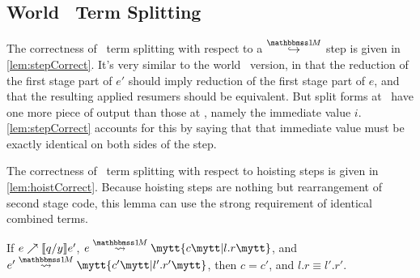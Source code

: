 \begin{abstrsyn}




\subsection{World \bbonem\ Term Splitting}

The correctness of \bbonem\ term splitting with respect to a $\stepsym \bbonem$ step is given in \ref{lem:stepCorrect}.
It's very similar to the world \bbtwo\ version, 
in that the reduction of the first stage part of $e'$ should imply reduction of the first stage part of $e$,
and that the resulting applied resumers should be equivalent.
But split forms at \bbonem\ have one more piece of output than those at \bbtwo,
namely the immediate value $i$.
\ref{lem:stepCorrect} accounts for this by saying that 
that immediate value must be exactly identical on both sides of the step.

The correctness of \bbonem\ term splitting with respect to hoisting steps is given in \ref{lem:hoistCorrect}.
Because hoisting steps are nothing but rearrangement of second stage code,
this lemma can use the strong requirement of identical combined terms.

\begin{lemma} 
\label{lem:hoistCorrect}
If ${e}\nearrow \llbracket q/y \rrbracket{e'}$, $\splitone e A c {l.r}$, and $\splitone {e'} A {c'} {l'.r'}$, then $c = c'$, and $l.r \equiv l'.r'$.
\end{lemma}


\end{abstrsyn}
